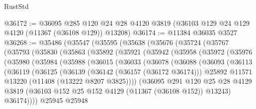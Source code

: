 \begin{lexlean}{RustStd}
\begin{coremodule}
@36172 := @36095
    @285
    @120
    @24
    @28
    @4120
    @3819
    (@36103 @129 @24 @129 @4120 (@11367 (@36108 @129)) @13208)
@36174 := @11384 @36035 @3527
@36268 := @35486
    (@35547
      (@35595
        (@35638
          (@35676
            (@35724
              (@35767
                (@35793
                  (@35830
                    (@35863
                      (@35892
                        (@35921
                          (@35942
                            (@35958
                              (@35972
                                (@35976
                                  (@35980
                                    (@35984
                                      (@35988
                                        (@36015
                                          (@36033
                                            (@36078
                                              (@36088
                                                (@36093
                                                  (@36113
                                                    (@36119
                                                      (@36125
                                                        (@36139
                                                          (@36142 (@36157 (@36172 @36174)))
                                                          @25892
                                                          @11571
                                                          @13220
                                                          (@11408 (@13222 @8207 @3825))))
                                                      (@36095
                                                        @291
                                                        @120
                                                        @25
                                                        @28
                                                        @4129
                                                        @3819
                                                        (@36103
                                                          @152
                                                          @25
                                                          @152
                                                          @4129
                                                          (@11367 (@36108 @152))
                                                          @13243)
                                                        @36174))))
                                                @25945
                                                @25948

\end{coremodule}
\end{lexlean}
